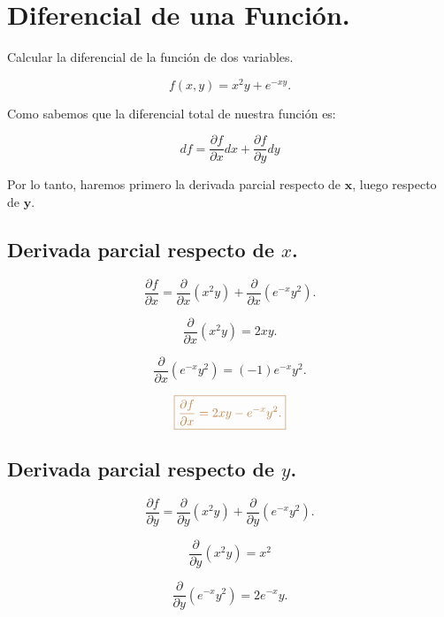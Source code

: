 \documentclass[a4paper,12pt]{article} %
\begin{document}
\section{Diferencial de una Función.}

\begin{justify}
	Calcular la diferencial de la función de dos variables.
\end{justify}

\[ f \left( x , y \right) = x^2y + e^{-xy}. \]

\begin{justify}
	Como sabemos que la diferencial total de nuestra función es:
\end{justify}

\[ df = \frac{\partial f}{\partial x}dx + \frac{\partial f}{\partial y}dy \]

\begin{justify}
	Por lo tanto, haremos primero la derivada parcial respecto de \( \mathbf{x}\), luego respecto de \( \mathbf{y}\).
\end{justify}

\subsection{Derivada parcial respecto de \( x \).}

\[ \frac{\partial f}{\partial x} = \frac{\partial}{\partial x} \left( x^2 y \right) + \frac{\partial}{\partial x} \left( e^{-x} y^2 \right). \]

\[ \frac{\partial}{\partial x} \left( x^2 y\right) = 2xy. \]

\[ \frac{\partial}{\partial x} \left( e^{-x} y^2 \right) = \left( -1 \right) e^{-x} y^2. \]

\vspace{\baselineskip}

\[ \textcolor{brown}{\boxed{ \frac{\partial f}{\partial x} = 2xy - e^{-x}y^2. }} \]


\subsection{Derivada parcial respecto de \( y \).}

\[ \frac{\partial f}{\partial y} = \frac{\partial}{\partial y} \left( x^2 y \right) + \frac{\partial}{\partial y} \left( e^{-x} y^2 \right). \]

\[ \frac{\partial}{\partial y} \left( x^2 y \right) = x^2 \]

\[ \frac{\partial}{\partial y} \left( e^{-x} y^2 \right) = 2 e^{-x}y.  \]
\end{document}
